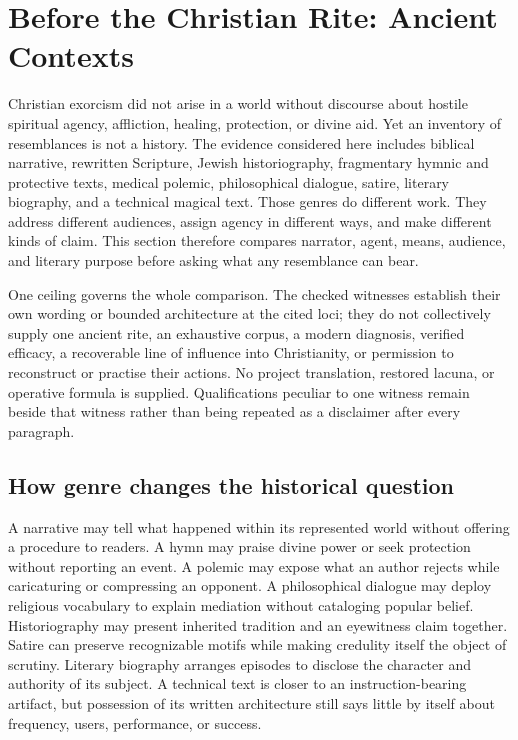 \section{Before the Christian Rite: Ancient Contexts}

Christian exorcism did not arise in a world without discourse about hostile
spiritual agency, affliction, healing, protection, or divine aid. Yet an
inventory of resemblances is not a history. The evidence considered here
includes biblical narrative, rewritten Scripture, Jewish historiography,
fragmentary hymnic and protective texts, medical polemic, philosophical
dialogue, satire, literary biography, and a technical magical text. Those
genres do different work. They address different audiences, assign agency in
different ways, and make different kinds of claim. This section therefore
compares narrator, agent, means, audience, and literary purpose before asking
what any resemblance can bear.

One ceiling governs the whole comparison. The checked witnesses establish
their own wording or bounded architecture at the cited loci; they do not
collectively supply one ancient rite, an exhaustive corpus, a modern
diagnosis, verified efficacy, a recoverable line of influence into
Christianity, or permission to reconstruct or practise their actions. No
project translation, restored lacuna, or operative formula is supplied.
Qualifications peculiar to one witness remain beside that witness rather than
being repeated as a disclaimer after every paragraph.

\subsection{How genre changes the historical question}

A narrative may tell what happened within its represented world without
offering a procedure to readers. A hymn may praise divine power or seek
protection without reporting an event. A polemic may expose what an author
rejects while caricaturing or compressing an opponent. A philosophical
dialogue may deploy religious vocabulary to explain mediation without
cataloging popular belief. Historiography may present inherited tradition and
an eyewitness claim together. Satire can preserve recognizable motifs while
making credulity itself the object of scrutiny. Literary biography arranges
episodes to disclose the character and authority of its subject. A technical
text is closer to an instruction-bearing artifact, but possession of its
written architecture still says little by itself about frequency, users,
performance, or success.

